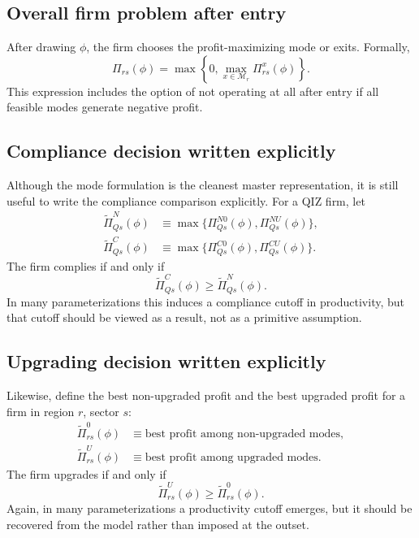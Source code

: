 \documentclass[11pt]{article}
\begin{document}
\subsection{Overall firm problem after entry}

After drawing \(\phi\), the firm chooses the profit-maximizing mode or exits. Formally,
\begin{equation}
\Pi_{rs}(\phi)=\max\left\{0,\max_{x\in\mathcal{M}_r}\Pi^x_{rs}(\phi)\right\}.
\label{eq:firm_overall_problem}
\end{equation}
This expression includes the option of not operating at all after entry if all feasible modes generate negative profit.

\subsection{Compliance decision written explicitly}

Although the mode formulation is the cleanest master representation, it is still useful to write the compliance comparison explicitly. For a QIZ firm, let
\begin{align}
\widetilde{\Pi}_{Qs}^N(\phi)&\equiv\max\{\Pi^{N0}_{Qs}(\phi),\Pi^{NU}_{Qs}(\phi)\},\\
\widetilde{\Pi}_{Qs}^C(\phi)&\equiv\max\{\Pi^{C0}_{Qs}(\phi),\Pi^{CU}_{Qs}(\phi)\}.
\end{align}
The firm complies if and only if
\begin{equation}
\widetilde{\Pi}_{Qs}^C(\phi)\ge \widetilde{\Pi}_{Qs}^N(\phi).
\label{eq:comply_condition_explicit}
\end{equation}
In many parameterizations this induces a compliance cutoff in productivity, but that cutoff should be viewed as a result, not as a primitive assumption.

\subsection{Upgrading decision written explicitly}

Likewise, define the best non-upgraded profit and the best upgraded profit for a firm in region \(r\), sector \(s\):
\begin{align}
\widetilde{\Pi}^{0}_{rs}(\phi)&\equiv \text{best profit among non-upgraded modes},\\
\widetilde{\Pi}^{U}_{rs}(\phi)&\equiv \text{best profit among upgraded modes}.
\end{align}
The firm upgrades if and only if
\begin{equation}
\widetilde{\Pi}^{U}_{rs}(\phi)\ge \widetilde{\Pi}^{0}_{rs}(\phi).
\label{eq:upgrade_condition_explicit}
\end{equation}
Again, in many parameterizations a productivity cutoff emerges, but it should be recovered from the model rather than imposed at the outset.
\end{document}
